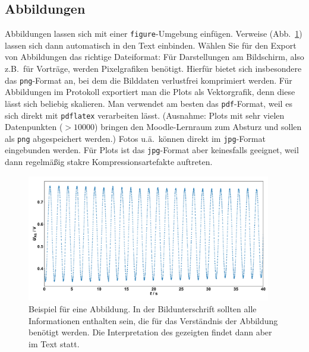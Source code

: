 \documentclass[twoside]{protokoll}
\begin{document}
\subsection*{Abbildungen}
Abbildungen lassen sich mit einer \texttt{figure}-Umgebung
einfügen. Verweise (Abb.~\ref{fig:beispiel}) lassen sich dann
automatisch in den Text einbinden. Wählen Sie für den Export von
Abbildungen das richtige Dateiformat: Für Darstellungen am Bildschirm,
also z.B.~für Vorträge, werden Pixelgrafiken benötigt. Hierfür bietet
sich insbesondere das \texttt{png}-Format an, bei dem die Bilddaten
verlustfrei komprimiert werden. Für Abbildungen im Protokoll
exportiert man die Plots als Vektorgrafik, denn diese lässt sich
beliebig skalieren. Man verwendet am besten das \texttt{pdf}-Format,
weil es sich direkt mit \texttt{pdflatex} verarbeiten
lässt. (Ausnahme: Plots mit sehr vielen Datenpunkten ($>10000$)
bringen den Moodle-Lernraum zum Absturz und sollen als \texttt{png}
abgespeichert werden.) Fotos u.ä.~können direkt im \texttt{jpg}-Format
eingebunden werden. Für Plots ist das \texttt{jpg}-Format aber
keinesfalls geeignet, weil dann regelmäßig stakre
Kompressionsartefakte auftreten.
\begin{figure}[t]
  \centering
  \includegraphics[width=0.95\textwidth]{beispiel_abbildung.pdf}
  \caption{Beispiel für eine Abbildung. In der Bildunterschrift
    sollten alle Informationen enthalten sein, die für das Verständnis
    der Abbildung benötigt werden. Die Interpretation des gezeigten
    findet dann aber im Text statt.}
  \label{fig:beispiel}
\end{figure}
\end{document}
